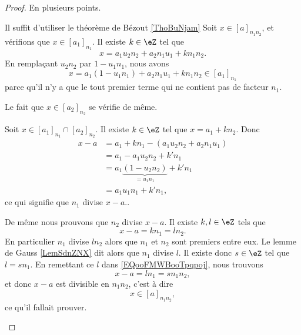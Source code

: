 \begin{proof}
	En plusieurs points.
	\begin{subproof}
		Il suffit d'utiliser le théorème de Bézout \ref{ThoBuNjam}
		Soit \( x\in[a]_{n_1n_2}\), et vérifions que \( x\in[a_1]_{n_1}\). Il existe \( k\in \eZ\) tel que
		\begin{equation}
			x=a_1u_2n_2+a_2n_1u_1+kn_1n_2.
		\end{equation}
		En remplaçant \( u_2n_2\) par \( 1-u_1n_1\), nous avons
		\begin{equation}
			x=a_1(1-u_1n_1)+a_2n_1u_1+kn_1n_2\in [a_1]_{n_1}
		\end{equation}
		parce qu'il n'y a que le tout premier terme qui ne contient pas de facteur \( n_1\).

		Le fait que \( x\in[a_2]_{n_2}\) se vérifie de même.

		Soit \( x\in [a_1]_{n_1}\cap [a_2]_{n_2}\). Il existe \( k\in \eZ\) tel que \( x=a_1+kn_2\). Donc
		\begin{subequations}
			\begin{align}
				x-a & =a_1+kn_1-(a_1u_2n_2+a_2n_1u_1)             \\
				    & =a_1-a_1u_2n_2+k'n_1                        \\
				    & =a_1\underbrace{(1-u_2n_2)}_{=u_1n_1}+k'n_1 \\
				    & =a_1u_1n_1+k'n_1,
			\end{align}
		\end{subequations}
		ce qui signifie que \( n_1\) divise \( x-a.\).

		De même nous prouvons que \( n_2\) divise \( x-a\). Il existe \( k,l\in \eZ\) tels que
		\begin{equation}        \label{EQooFMWBooTpqpoj}
			x-a=kn_1=ln_2.
		\end{equation}
		En particulier \( n_1\) divise \( ln_2\) alors que \( n_1\) et \( n_2\) sont premiers entre eux. Le lemme de Gauss \ref{LemSdnZNX} dit alors que \( n_1\) divise \( l\). Il existe donc \( s\in \eZ\) tel que \( l=sn_1\). En remettant ce \( l\) dans \eqref{EQooFMWBooTpqpoj}, nous trouvons
		\begin{equation}
			x-a=ln_1=sn_1n_2,
		\end{equation}
		et donc \( x-a\) est divisible en \( n_1n_2\), c'est à dire
		\begin{equation}
			x\in [a]_{n_1n_2},
		\end{equation}
		ce qu'il fallait prouver.
	\end{subproof}
\end{proof}

